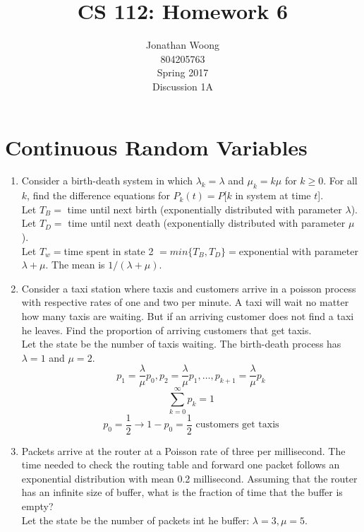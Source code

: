 \documentclass[10.5pt,letterpaper]{article}
\date{\displaydate{date}}
\begin{document}
\title{CS 112: Homework 6}
\author{
	Jonathan Woong\\
	804205763\\
	Spring 2017\\
	Discussion 1A}
\maketitle
\pagebreak


\section{Continuous Random Variables}
\begin{enumerate}[label=\textbf{Problem \arabic*.}]
\item Consider a birth-death system in which $\lambda_k=\lambda$ and $\mu_k=k\mu$ for $k \geq 0$. For all $k$, find the difference equations for $P_k(t)=P[k$ in system at time $t$].\\
Let $T_B = $ time until next birth (exponentially distributed with parameter $\lambda$).\\
Let $T_D = $ time until next death (exponentially distributed with parameter $\mu$).\\
Let $T_w = $time spent in state 2 $= min\{T_B,T_D\} = $exponential with parameter $\lambda + \mu$. The mean is $\boxed{1/(\lambda + \mu)}$. 
\item Consider a taxi station where taxis and customers arrive in a poisson process with respective rates of one and two per minute. A taxi will wait no matter how many taxis are waiting. But if an arriving customer does not find a taxi he leaves. Find the proportion of arriving customers that get taxis.\\
Let the state be the number of taxis waiting. The birth-death process has $\lambda=1$ and $\mu=2$.
\[p_1 = \frac{\lambda}{\mu}p_0, p_2=\frac{\lambda}{\mu}p_1,\dots,p_{k+1}=\frac{\lambda}{\mu}p_k\]
\[\sum_{k=0}^{\infty}p_k=1\]
\[\boxed{p_0=\frac{1}{2} \rightarrow 1-p_0=\frac{1}{2}\text{ customers get taxis}}\]
\item Packets arrive at the router at a Poisson rate of three per millisecond. The time needed to check the routing table and forward one packet follows an exponential distribution with mean 0.2 millisecond. Assuming that the router has an infinite size of buffer, what is the fraction of time that the buffer is empty?\\
Let the state be the number of packets int he buffer: $\lambda=3,\mu=5$.

\end{enumerate}
\end{document}
